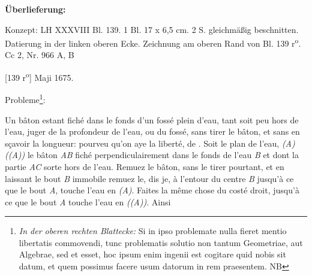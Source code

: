  \begin{ledgroupsized}[r]{120mm}
                \footnotesize 
                \pstart                
                \noindent\textbf{\"{U}berlieferung:}   
                \pend
                \end{ledgroupsized}
            
              
                            \begin{ledgroupsized}[r]{114mm}
                            \footnotesize 
                            \pstart \parindent -6mm
                            Konzept: LH XXXVIII Bl. 139. 1 Bl. 17 x 6,5 cm.  2 S. gleichm\"{a}ßig beschnitten. Datierung in der linken oberen Ecke. Zeichnung am oberen Rand von Bl. 139 r\textsuperscript{o}.\\Cc 2, Nr. 966 A, B \pend
                            \end{ledgroupsized}
                \vspace*{8mm}
                \pstart 
                \normalsize
            [139 r\textsuperscript{o}] Maji 1675.   \begin{center}Probleme\footnote{\textit{In der oberen rechten Blattecke:} Si in ipso problemate nulla fieret mentio libertatis commovendi, tunc problematis solutio  non tantum Geometriae, aut Algebrae, sed et  esset, hoc ipsum enim ingenii est cogitare quid nobis sit datum, et quem possimus facere usum datorum in rem praesentem. NB }:\end{center}\pend \pstart Un bâton estant fich\'{e} dans le fonds d'un foss\'{e} plein d'eau,  tant soit peu hors de l'eau, juger de la profondeur de l'eau, ou du foss\'{e}, sans tirer le bâton, et sans en s\c{c}avoir la longueur: pourveu qu'on aye la libert\'{e}, de .\pend
            \pstart Soit le plan de l'eau, \textit{(A)((A))} le bâton \textit{AB} fich\'{e} perpendiculairement dans le fonds de l'eau \textit{B} et dont la partie \textit{AC} sorte hors de l'eau. Remuez le bâton, sans 
            le tirer pourtant, et en laissant le bout \textit{B} immobile remuez le, dis je, \`{a} l'entour du centre \textit{B}  jusqu'\`{a} ce que le bout \textit{A}, touche l'eau en \textit{(A)}. Faites  la même chose du cost\'{e} droit, jusqu'\`{a} ce que le bout \textit{A} touche l'eau en \textit{((A))}. Ainsi